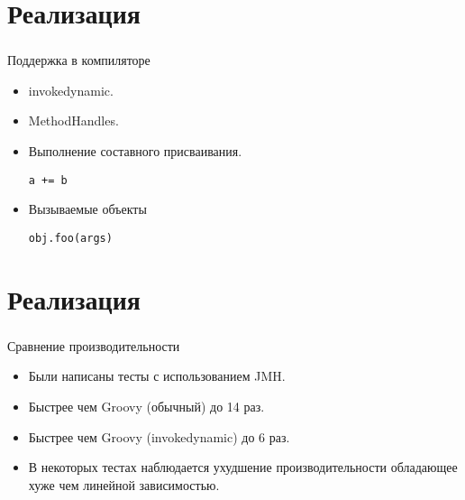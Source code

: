 \documentclass[t]{beamer}  %
\begin{document}
\section{Реализация}
\begin{frame}[fragile]
	\frametitle{\insertsection} 
    \begin{block}{Поддержка в компиляторе}
\begin{itemize}	
	\item invokedynamic.
    \item MethodHandles.
    \item Выполнение составного присваивания.
    \begin{verbatim}
a += b
	\end{verbatim}
    \item Вызываемые объекты
    \begin{verbatim}
obj.foo(args)
	\end{verbatim}
    \end{itemize}
    \end{block}
\end{frame}

\section{Реализация}
\begin{frame}[fragile]
	\frametitle{\insertsection} 
    \begin{block}{Сравнение производительности}
\begin{itemize}	
	\item Были написаны тесты с использованием JMH.
    \item Быстрее чем Groovy (обычный) до 14 раз.
    \item Быстрее чем Groovy (invokedynamic) до 6 раз.
    \item В некоторых тестах наблюдается ухудшение производительности обладающее хуже чем линейной зависимостью.
    \end{itemize}
    \end{block}
\end{frame}
\end{document}
